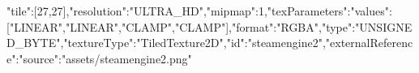 {"tile":[27,27],"resolution":"ULTRA_HD","mipmap":1,"texParameters":{"values":["LINEAR","LINEAR","CLAMP","CLAMP"]},"format":"RGBA","type":"UNSIGNED_BYTE","textureType":"TiledTexture2D","id":"steamengine2","externalReference":{"source":"assets/steamengine2.png"}}